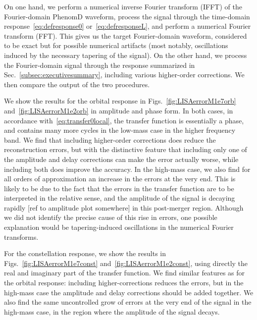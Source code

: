 \documentclass[aps,showpacs,twocolumn,
prd,superscriptaddress,nofootinbib]{revtex4-1}
\newcommand{\SM}[1]{{\color{Red} #1}}
\begin{document}
On one hand, we perform a numerical inverse Fourier transform (IFFT) of the Fourier-domain PhenomD waveform, process the signal through the time-domain response~\eqref{eq:defresponse0} or~\eqref{eq:defresponseL}, and perform a numerical Fourier transform (FFT). This gives us the target Fourier-domain waveform, considered to be exact but for possible numerical artifacts (most notably, oscillations induced by the necessary tapering of the signal). On the other hand, we process the Fourier-domain signal through the response summarized in Sec.~\ref{subsec:executivesummary}, including various higher-order corrections. We then compare the output of the two procedures.

We show the results for the orbital response in Figs.~\ref{fig:LISAerrorM1e7orb} and~\ref{fig:LISAerrorM1e2orb} in amplitude and phase form. In both cases, in accordance with~\eqref{eq:transfer0local}, the transfer function is essentially a phase, and contains many more cycles in the low-mass case in the higher frequency band. We find that including higher-order corrections does reduce the reconstruction errors, but with the distinctive feature that including only one of the amplitude and delay corrections can make the error actually worse, while including both does improve the accuracy. In the high-mass case, we also find for all orders of approximation an increase in the errors at the very end. This is likely to be due to the fact that the errors in the transfer function are to be interpreted in the relative sense, and the amplitude of the signal is decaying rapidly \SM{[ref to amplitude plot somewhere]} in this post-merger region. Although we did not identify the precise cause of this rise in errors, one possible explanation would be tapering-induced oscillations in the numerical Fourier transforms.

For the constellation response, we show the results in Figs.~\ref{fig:LISAerrorM1e7const} and~\ref{fig:LISAerrorM1e2const}, using directly the real and imaginary part of the transfer function. We find similar features as for the orbital response: including higher-corrections reduces the errors, but in the high-mass case the amplitude and delay corrections should be added together. We also find the same uncontrolled grow of errors at the very end of the signal in the high-mass case, in the region where the amplitude of the signal decays.
\end{document}
